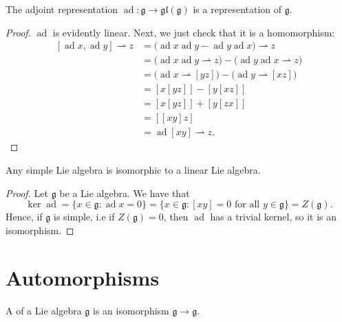 \documentclass{article}
\newcommand{\lb}[1]{\ensuremath{\left[{#1}\right]}}
\DeclareMathOperator{\ad}{ad}
\newcommand*\frkg{{\ensuremath{\mathfrak{g}}}}
\newcommand*\glalg{\ensuremath{\mathfrak{gl}}}
\begin{document}
\begin{theorem}
    The adjoint representation $\ad: \frkg \to \glalg(\frkg)$ is a representation of $\frkg$.
\end{theorem}

\begin{proof}
    $\ad$ is evidently linear.
    Next, we just check that it is a homomorphism:
    \begin{align*}
        \lb{\ad x, \ad y} \rightharpoonup z
        &=
        \Big(\ad x \ad y - \ad y \ad x\Big) \rightharpoonup z 
        \\
        &=
        \Big(\ad x \ad y \rightharpoonup z\Big) - \Big(\ad y \ad x \rightharpoonup z\Big) 
        \\
        &=
        \Big(
            \ad x \rightharpoonup \lb{yz}
        \Big)
        - 
        \Big(
            \ad y \rightharpoonup \lb{xz}
        \Big)
        \\
        &=
        \lb{x\lb{yz}} - \lb{y\lb{xz}}
        \\
        &=
        \lb{x\lb{yz}} + \lb{y\lb{zx}}
        \\
        &=
        \lb{\lb{xy}z}
        \\
        &=
        \ad \lb{xy} \rightharpoonup z.
    \end{align*}
\end{proof}

\begin{corollary}
    Any simple Lie algebra is isomorphic to a linear Lie algebra.
\end{corollary}

\begin{proof}
    Let $\frkg$ be a Lie algebra.
    We have that
    \[
        \ker \ad 
        =
        \Big\{
            x \in \frkg: \ad x = 0
        \Big\}
        =
        \Big\{
            x \in \frkg: \lb{xy} = 0 \text{ for all } y \in \frkg
        \Big\}
        =
        Z(\frkg).
    \]
    Hence, if $\frkg$ is simple, i.e if $Z(\frkg) = 0$, then $\ad$ has a trivial kernel, so it is an isomorphism. 
\end{proof}

\section{Automorphisms}

\begin{definition}
    A  of a Lie algebra $\frkg$ is an isomorphism $\frkg \to \frkg$.
\end{definition}
\end{document}
